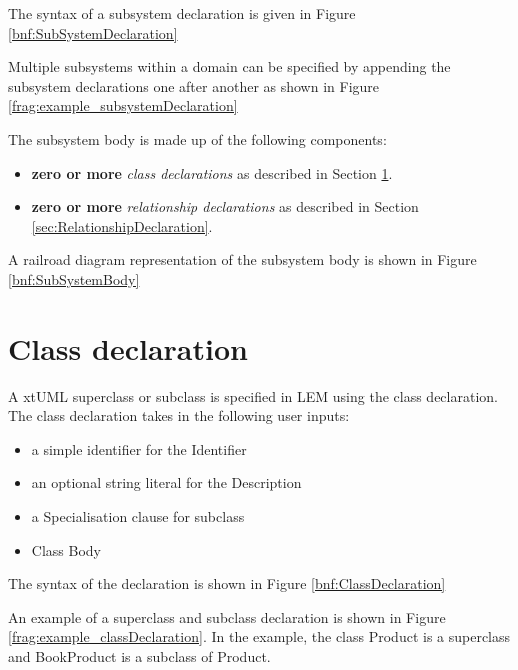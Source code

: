 The syntax of a subsystem declaration is given in Figure \ref{bnf:SubSystemDeclaration}


Multiple subsystems within a domain can be specified by appending the subsystem declarations one after another as shown in Figure \ref{frag:example_subsystemDeclaration}


The subsystem body is made up of the following components:
\begin{itemize}
\item \textbf{zero or more} \textit{class declarations} as described in Section \ref{sec:ClassDeclaration}.
\item \textbf{zero or more} \textit{relationship declarations} as described in Section \ref{sec:RelationshipDeclaration}.
\end{itemize}

A railroad diagram representation of the subsystem body is shown in Figure \ref{bnf:SubSystemBody}


\section{Class declaration}\label{sec:ClassDeclaration}
A xtUML superclass or subclass is specified in LEM using the class declaration. The class declaration takes in the following user inputs:

\begin{itemize}
\item a simple identifier for the Identifier
\item an optional string literal for the Description
\item a Specialisation clause for subclass
\item Class Body
\end{itemize}

The syntax of the declaration is shown in Figure \ref{bnf:ClassDeclaration}

An example of a superclass and subclass declaration is shown in Figure \ref{frag:example_classDeclaration}. In the example, the class Product is a superclass and BookProduct is a subclass of Product.

